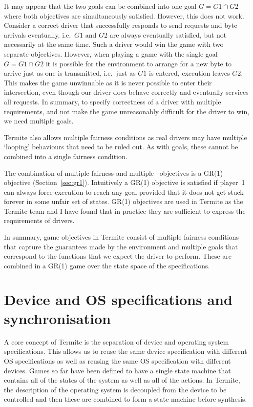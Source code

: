 It may appear that the two goals can be combined into one goal $G = G1 \cap G2$ where both objectives are simultaneously satisfied. However, this does not work. Consider a correct driver that successfully responds to send requests and byte arrivals eventually, i.e.\ $G1$ and $G2$ are always eventually satisfied, but not necessarily at the same time. Such a driver would win the game with two separate objectives. However, when playing a game with the single goal $G = G1 \cap G2$ it is possible for the environment to arrange for a new byte to arrive just as one is transmitted, i.e.\ just as $G1$ is entered, execution leaves $G2$. This makes the game unwinnable as it is never possible to enter their intersection, even though our driver does behave correctly and eventually services all requests. In summary, to specify correctness of a driver with multiple requirements, and not make the game unreasonably difficult for the driver to win, we need multiple goals. 

Termite also allows multiple fairness conditions as real drivers may have multiple `looping' behaviours that need to be ruled out. As with goals, these cannot be combined into a single fairness condition.

The combination of multiple fairness and multiple \buchi\ objectives is a GR(1) objective (Section~\ref{sec:gr1}). Intuitively a GR(1) objective is satisfied if player~1 can always force execution to reach any goal provided that it does not get stuck forever in some unfair set of states. GR(1) objectives are used in Termite as the Termite team and I have found that in practice they are sufficient to express the requirements of drivers. 

In summary, game objectives in Termite consist of multiple fairness conditions that capture the guarantees made by the environment and multiple goals that correspond to the functions that we expect the driver to perform. These are combined in a GR(1) game over the state space of the specifications.

\section{Device and OS specifications and synchronisation}
\label{sec:composition}

A core concept of Termite is the separation of device and operating system specifications. This allows us to reuse the same device specification with different OS specifications as well as reusing the same OS specification with different devices. Games so far have been defined to have a single state machine that contains all of the states of the system as well as all of the actions. In Termite, the description of the operating system is decoupled from the device to be controlled and then these are combined to form a state machine before synthesis.

